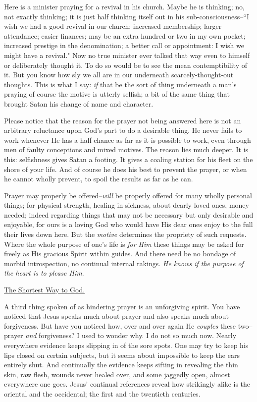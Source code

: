 Here is a minister praying for a revival in his church. Maybe he is
thinking; no, not exactly thinking; it is just half thinking itself out in
his sub-consciousness--``I wish we had a good revival in our church;
increased membership; larger attendance; easier finances; may be an extra
hundred or two in my own pocket; increased prestige in the denomination; a
better call or appointment: I wish we might have a revival." Now no true
minister ever talked that way even to himself or deliberately thought it.
To do so would be to see the mean contemptibility of it. But you know how
sly we all are in our underneath scarcely-thought-out thoughts. This is
what I say: \textit{if} that be the sort of thing underneath a man's praying of
course the motive is utterly selfish; a bit of the same thing that brought
Satan his change of name and character.

Please notice that the reason for the prayer not being answered here is
not an arbitrary reluctance upon God's part to do a desirable thing. He
never fails to work whenever He has a half chance as far as it is possible
to work, even through men of faulty conceptions and mixed motives. The
reason lies much deeper. It is this: selfishness gives Satan a footing. It
gives a coaling station for his fleet on the shore of your life. And of
course he does his best to prevent the prayer, or when he cannot wholly
prevent, to spoil the results as far as he can.

Prayer may properly be offered--\textit{will} be properly offered for many wholly
personal things; for physical strength, healing in sickness, about dearly
loved ones, money needed; indeed regarding things that may not be
necessary but only desirable and enjoyable, for ours is a loving God who
would have His dear ones enjoy to the full their lives down here. But the
\textit{motive} determines the propriety of such requests. Where the whole
purpose of one's life is \textit{for Him} these things may be asked for freely as
His gracious Spirit within guides. And there need be no bondage of morbid
introspection, no continual internal rakings. \textit{He knows if the purpose of
the heart is to please Him}.



\underline{The Shortest Way to God.}


A third thing spoken of as hindering prayer is an unforgiving spirit. You
have noticed that Jesus speaks much about prayer and also speaks much
about forgiveness. But have you noticed how, over and over again He
\textit{couples} these two--prayer \textit{and} forgiveness? I used to wonder why. I do
not so much now. Nearly everywhere evidence keeps slipping in of the sore
spots. One may try to keep his lips closed on certain subjects, but it
seems about impossible to keep the ears entirely shut. And continually the
evidence keeps sifting in revealing the thin skin, raw flesh, wounds
never healed over, and some jaggedly open, almost everywhere one goes.
Jesus' continual references reveal how strikingly alike is the oriental
and the occidental; the first and the twentieth centuries.

